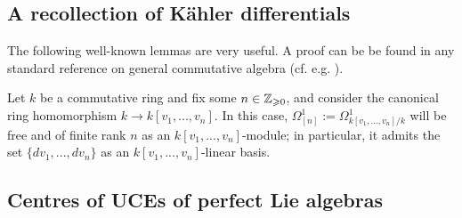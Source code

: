     \subsection{A recollection of K\"ahler differentials}
        \begin{definition} \label{def: kahler_differentials}
            
        \end{definition}
        The following well-known lemmas are very useful. A proof can be be found in any standard reference on general commutative algebra (cf. e.g. \cite[\href{https://stacks.math.columbia.edu/tag/00AO}{Tag 00AO}]{stacks}).
        \begin{lemma}
            \cite[\href{https://stacks.math.columbia.edu/tag/00RX}{Tag 00RX}]{stacks} Let $k$ be a commutative ring and fix some $n \in \mathbb{Z}_{\geqslant 0}$, and consider the canonical ring homomorphism $k \to k[v_1, ..., v_n]$. In this case, $\Omega^1_{[n]} := \Omega^1_{k[v_1, ..., v_n]/k}$ will be free and of finite rank $n$ as an $k[v_1, ..., v_n]$-module; in particular, it admits the set $\{dv_1, ..., dv_n\}$ as an $k[v_1, ..., v_n]$-linear basis. 
        \end{lemma}

    \subsection{Centres of UCEs of perfect Lie algebras}
        \begin{example}
            
        \end{example}